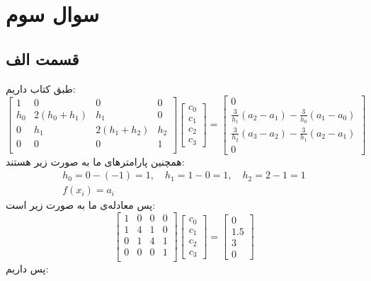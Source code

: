 \documentclass[]{article}
\begin{document}
\section*{سوال سوم}
\subsection*{قسمت الف}
طبق کتاب داریم:
\[
\begin{bmatrix}
    1 & 0 & 0 & 0 \\
    h_0 & 2(h_0+h_1) & h_1 & 0 \\
    0 & h_1 & 2(h_1+h_2) & h_2\\
    0 & 0 & 0 & 1 \\
\end{bmatrix}
\begin{bmatrix}
    c_0\\
    c_1\\
    c_2\\
    c_3
\end{bmatrix}
=
\begin{bmatrix}
    0\\
    \frac{3}{h_1}(a_2 - a_1) - \frac{3}{h_0}(a_1 - a_0)\\
    \frac{3}{h_2}(a_3 - a_2) - \frac{3}{h_1}(a_2 - a_1)\\
    0
\end{bmatrix}
\]
همچنین پارامتر‌های ما به صورت زیر هستند:
\begin{gather*}
    h_0 = 0 - (-1) = 1, \quad h_1 = 1 - 0 = 1, \quad h_2 = 2 - 1 = 1\\
    f(x_i) = a_i
\end{gather*}
پس معادله‌ی ما به صورت زیر است:
\[
\begin{bmatrix}
    1 & 0 & 0 & 0 \\
    1 & 4 & 1 & 0 \\
    0 & 1 & 4 & 1\\
    0 & 0 & 0 & 1 \\
\end{bmatrix}
\begin{bmatrix}
    c_0\\
    c_1\\
    c_2\\
    c_3
\end{bmatrix}
=
\begin{bmatrix}
    0\\
    1.5\\
    3\\
    0
\end{bmatrix}
\]
پس داریم:
\end{document}
